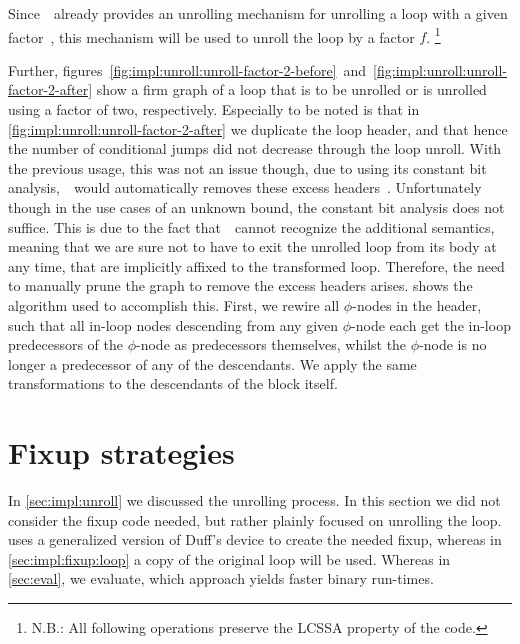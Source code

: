 Since~\libFIRM~already provides an unrolling mechanism for unrolling a loop with a given factor~\cite{aebi18bachelorarbeit}, this mechanism will be used to unroll the loop by a factor $f$.
\footnote{N.B.: All following operations preserve the LCSSA property of the code.}

Further, figures~\ref{fig:impl:unroll:unroll-factor-2-before}~and~\ref{fig:impl:unroll:unroll-factor-2-after} show a firm graph of a loop that is to be unrolled or is unrolled using a factor of two, respectively.
Especially to be noted is that in \cref{fig:impl:unroll:unroll-factor-2-after} we duplicate the loop header, and that hence the number of conditional jumps did not decrease through the loop unroll.
With the previous usage, this was not an issue though, due to using its constant bit analysis,~\libFIRM~would automatically removes these excess headers~\cite{aebi18bachelorarbeit}.
Unfortunately though in the use cases of an unknown bound, the constant bit analysis does not suffice.
This is due to the fact that~\libFIRM~cannot recognize the additional semantics, meaning that we are sure not to have to exit the unrolled loop from its body at any time, that are implicitly affixed to the transformed loop.
Therefore, the need to manually prune the graph to remove the excess headers arises.
 shows the algorithm used to accomplish this.
First, we rewire all $\phi$-nodes in the header, such that all in-loop nodes descending from any given $\phi$-node each get the in-loop predecessors of the $\phi$-node as predecessors themselves, whilst the $\phi$-node is no longer a predecessor of any of the descendants.
We apply the same transformations to the descendants of the block itself.







\section{Fixup strategies}\label{sec:impl:fixup}

In \cref{sec:impl:unroll} we discussed the unrolling process.
In this section we did not consider the fixup code needed, but rather plainly focused on unrolling the loop.
 uses a generalized version of Duff's device to create the needed fixup, whereas in \cref{sec:impl:fixup:loop} a copy of the original loop will be used.
Whereas in \cref{sec:eval}, we evaluate, which approach yields faster binary run-times.

